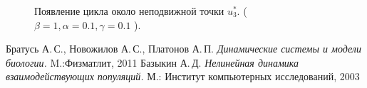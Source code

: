 \documentclass[10pt]{article}
\numberwithin{equation}{section}
\begin{document}
\newpage
\begin{figure}[h]
	\caption{Появление цикла около неподвижной точки \( u_3^* \). ( \( \beta = 1, \alpha = 0.1, \gamma  = 0.1 \) ).}
\end{figure}

\newpage
\begin{thebibliography}{0}
Братусь А.\,С., Новожилов А.\,С., Платонов А.\,П. \emph{Динамические системы и модели биологии.} M.:Физматлит, 2011
Базыкин А.\,Д. \emph{Нелинейная динамика взаимодействующих популяций.} М.: Институт компьютерных исследований, 2003
\end{thebibliography}
\end{document}
